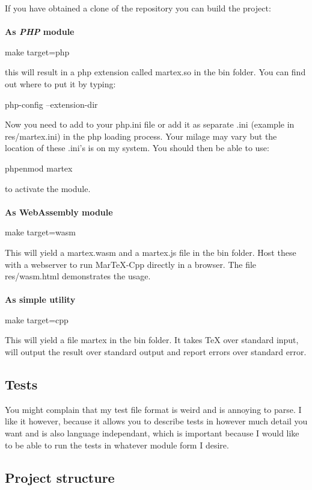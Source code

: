 \begin{page}
If you have obtained a clone of the repository you can build the project:
\\ \\
\textbf{As \textit{PHP} module}
\begin{code}
make target=php
\end{code}
this will result in a php extension called martex.so in the bin folder. You can find out where to put it by typing:
\begin{code}
php-config --extension-dir
\end{code}
Now you need to add  to your php.ini file or add it as separate .ini (example in res/martex.ini) in the php loading process. Your milage may vary but the location of these .ini's is  on my system. You should then be able to use:
\begin{code}
phpenmod martex
\end{code}
to activate the module.
\\ \\
\textbf{As \textbf{WebAssembly} module}
\begin{code}
make target=wasm
\end{code}
This will yield a martex.wasm and a martex.js file in the bin folder. Host these with a webserver to run MarTeX-Cpp directly in a browser. The file res/wasm.html demonstrates the usage.
\\ \\
\textbf{As simple utility}
\begin{code}
make target=cpp
\end{code}
This will yield a file martex in the bin folder. It takes TeX over standard input, will output the result over standard output and report errors over standard error.

\subsection{Tests}

You might complain that my test file format is weird and is annoying to parse. I like it however, because it allows you to describe tests in however much detail you want and is also language independant, which is important because I would like to be able to run the tests in whatever module form I desire. 

\subsection{Project structure}


\end{page}
